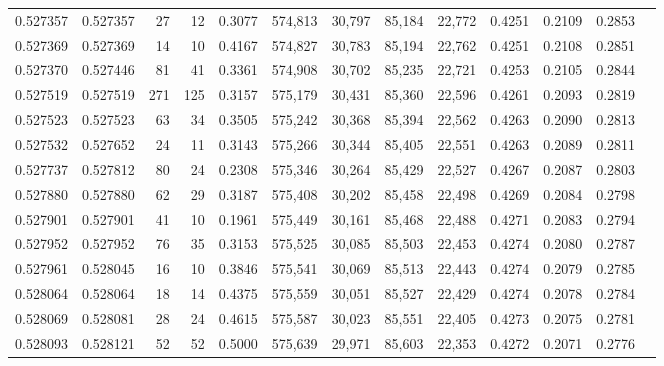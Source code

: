 \begin{tabular}{rrrrrrrrrrrrr}
0.527357 & 0.527357 &    27 &    12 &                                     0.3077 & 574,813 &  30,797 &  85,184 &  22,772 & 0.4251 & 0.2109 & 0.2853 \\
0.527369 & 0.527369 &    14 &    10 &                                     0.4167 & 574,827 &  30,783 &  85,194 &  22,762 & 0.4251 & 0.2108 & 0.2851 \\
0.527370 & 0.527446 &    81 &    41 &                                     0.3361 & 574,908 &  30,702 &  85,235 &  22,721 & 0.4253 & 0.2105 & 0.2844 \\
0.527519 & 0.527519 &   271 &   125 &                                     0.3157 & 575,179 &  30,431 &  85,360 &  22,596 & 0.4261 & 0.2093 & 0.2819 \\
0.527523 & 0.527523 &    63 &    34 &                                     0.3505 & 575,242 &  30,368 &  85,394 &  22,562 & 0.4263 & 0.2090 & 0.2813 \\
0.527532 & 0.527652 &    24 &    11 &                                     0.3143 & 575,266 &  30,344 &  85,405 &  22,551 & 0.4263 & 0.2089 & 0.2811 \\
0.527737 & 0.527812 &    80 &    24 &                                     0.2308 & 575,346 &  30,264 &  85,429 &  22,527 & 0.4267 & 0.2087 & 0.2803 \\
0.527880 & 0.527880 &    62 &    29 &                                     0.3187 & 575,408 &  30,202 &  85,458 &  22,498 & 0.4269 & 0.2084 & 0.2798 \\
0.527901 & 0.527901 &    41 &    10 &                                     0.1961 & 575,449 &  30,161 &  85,468 &  22,488 & 0.4271 & 0.2083 & 0.2794 \\
0.527952 & 0.527952 &    76 &    35 &                                     0.3153 & 575,525 &  30,085 &  85,503 &  22,453 & 0.4274 & 0.2080 & 0.2787 \\
0.527961 & 0.528045 &    16 &    10 &                                     0.3846 & 575,541 &  30,069 &  85,513 &  22,443 & 0.4274 & 0.2079 & 0.2785 \\
0.528064 & 0.528064 &    18 &    14 &                                     0.4375 & 575,559 &  30,051 &  85,527 &  22,429 & 0.4274 & 0.2078 & 0.2784 \\
0.528069 & 0.528081 &    28 &    24 &                                     0.4615 & 575,587 &  30,023 &  85,551 &  22,405 & 0.4273 & 0.2075 & 0.2781 \\
0.528093 & 0.528121 &    52 &    52 &                                     0.5000 & 575,639 &  29,971 &  85,603 &  22,353 & 0.4272 & 0.2071 & 0.2776 \\

\end{tabular}
